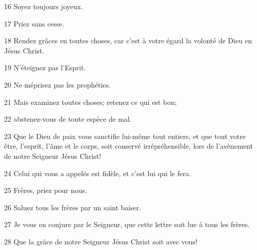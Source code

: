 \par 16 Soyez toujours joyeux.
\par 17 Priez sans cesse.
\par 18 Rendez grâces en toutes choses, car c'est à votre égard la volonté de Dieu en Jésus Christ.
\par 19 N'éteignez pas l'Esprit.
\par 20 Ne méprisez pas les prophéties.
\par 21 Mais examinez toutes choses; retenez ce qui est bon;
\par 22 abstenez-vous de toute espèce de mal.
\par 23 Que le Dieu de paix vous sanctifie lui-même tout entiers, et que tout votre être, l'esprit, l'âme et le corps, soit conservé irrépréhensible, lors de l'avènement de notre Seigneur Jésus Christ!
\par 24 Celui qui vous a appelés est fidèle, et c'est lui qui le fera.
\par 25 Frères, priez pour nous.
\par 26 Saluez tous les frères par un saint baiser.
\par 27 Je vous en conjure par le Seigneur, que cette lettre soit lue à tous les frères.
\par 28 Que la grâce de notre Seigneur Jésus Christ soit avec vous!


